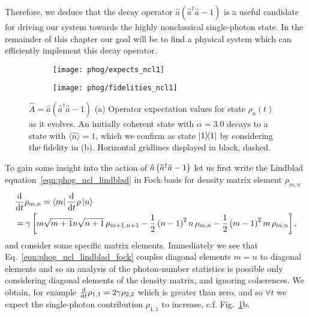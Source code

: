 Therefore, we deduce that the decay operator $\hat{a}\left(\hat{a}^\dagger \hat{a} - 1\right)$ is a useful candidate for driving our system towards the highly nonclassical single-photon state. In the remainder of this chapter our goal will be to find a physical system which can efficiently implement this decay operator.



\begin{figure}[htp]
\centering
	\begin{subfigure}{0.6\linewidth}
	\centering
	\texttt{[image: phog/expects\_ncl1]}
	\caption{}
	\end{subfigure}
	\begin{subfigure}{0.6\linewidth}
	\centering
	\texttt{[image: phog/fidelities\_ncl1]}
	\caption{}
	\end{subfigure}
\caption{\label{fig:phog_A_ncl}$\hat{A} = \hat{a}\left(\hat{a}^\dagger \hat{a} - 1\right)$ (a) Operator expectation values for state $\rho_a\left(t\right)$ as it evolves. An initially coherent state with $\alpha=3.0$ decays to a state with $\langle \hat{n}\rangle=1$, which we confirm as state $\dyad{1}$ by considering the fidelity in (b). Horizontal gridlines displayed in black, dashed.}
\end{figure}

To gain some insight into the action of $\hat{a}\left(\hat{a}^\dagger \hat{a} - 1\right)$ let us first write the Lindblad equation~\ref{eqn:phog_ncl_lindblad} in Fock basis for density matrix element $\rho_{m, n}$
\begin{align}\label{eqn:phog_ncl_lindblad_fock}
&\ddt \rho_{m, n} = \bra{m} \ddt \rho \ket{n} \notag  \\
%
&= \gamma \left[ m \sqrt{m+1} n \sqrt{n+1} \, \rho_{m+1, n+1} - \frac{1}{2} \left(n-1\right)^2 n\, \rho_{m, n} - \frac{1}{2} \left(m-1\right)^2 m\, \rho_{m, n}\right],
\end{align}
and consider some specific matrix elements. Immediately we see that Eq.~\ref{eqn:phog_ncl_lindblad_fock} couples diagonal elements $m=n$ to diagonal elements and so an analysis of the photon-number statistics is possible only considering diagonal elements of the density matrix, and ignoring coherences. We obtain, for example $\frac{\mathrm{d}}{\mathrm{d}t} \rho_{1, 1}=2 \gamma \rho_{2, 2}$ which is greater than zero, and so $\forall t$ we expect the single-photon contribution $\rho_{1,1}$ to increase, c.f. Fig.~\ref{fig:phog_A_ncl}b. 

